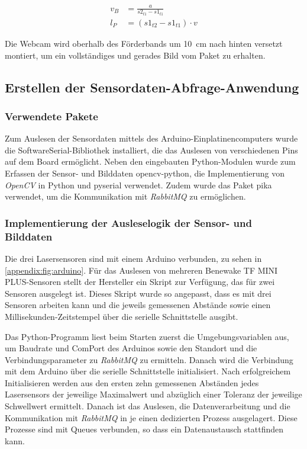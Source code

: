 \begin{align}
  v_B & = \frac{a}{s2_{t1} - s1_{t1}} \label{eq:bandgeschwindigkeit}  \\
  l_P & = \left( s1_{t2} - s1_{t1} \right) \cdot v  \label{eq:laenge}
\end{align}

Die Webcam wird oberhalb des Förderbands um \SI{10}{\centi\metre} nach hinten versetzt montiert, um ein vollständiges und gerades Bild vom Paket zu erhalten.


\subsection{Erstellen der Sensordaten-Abfrage-Anwendung}


\subsubsection{Verwendete Pakete}

Zum Auslesen der Sensordaten mittels des Arduino-Einplatinencomputers wurde die SoftwareSerial-Bibliothek installiert, die das Auslesen von verschiedenen Pins auf dem Board ermöglicht. Neben den eingebauten Python-Modulen wurde zum Erfassen der Sensor- und Bilddaten opencv-python, die Implementierung von \textit{\gls{OpenCV}} in Python und pyserial verwendet. Zudem wurde das Paket pika verwendet, um die Kommunikation mit \textit{\gls{RabbitMQ}} zu ermöglichen.


\subsubsection[Implementierung der Ausleselogik]{Implementierung der Ausleselogik der Sensor- und Bilddaten}

Die drei Lasersensoren sind mit einem Arduino verbunden, zu sehen in \vref{appendix:fig:arduino}. Für das Auslesen von mehreren Benewake TF MINI PLUS-Sensoren stellt der Hersteller ein Skript zur Verfügung, das für zwei Sensoren ausgelegt ist. \autocite{tfmini-arduino} Dieses Skript wurde so angepasst, dass es mit drei Sensoren arbeiten kann und die jeweils gemessenen Abstände sowie einen Millisekunden-Zeitstempel über die serielle Schnittstelle ausgibt.

Das Python-Programm liest beim Starten zuerst die Umgebungsvariablen aus, um Baudrate und ComPort des Arduinos sowie den Standort und die Verbindungsparameter zu \textit{\gls{RabbitMQ}} zu ermitteln. Danach wird die Verbindung mit dem Arduino über die serielle Schnittstelle initialisiert. Nach erfolgreichem Initialisieren werden aus den ersten zehn gemessenen Abständen jedes Lasersensors der jeweilige Maximalwert und abzüglich einer Toleranz der jeweilige Schwellwert ermittelt. Danach ist das Auslesen, die Datenverarbeitung und die Kommunikation mit \textit{\gls{RabbitMQ}} in je einen dedizierten Prozess ausgelagert. Diese Prozesse sind mit Queues verbunden, so dass ein Datenaustausch stattfinden kann.


